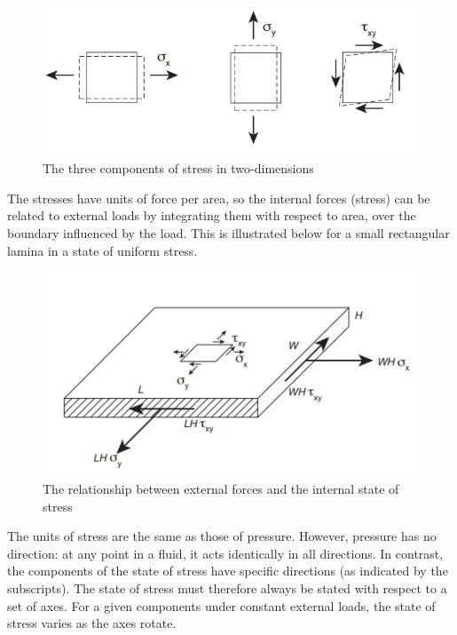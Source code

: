 \documentclass{article}
\begin{document}
\begin{figure}[h]
    \centering
    \includegraphics{images/stress1.png}
    \caption{The three components of stress in two-dimensions}
    \label{fig:enter-label}
\end{figure}

The stresses have units of force per area, so the internal forces (stress) can be related to external loads by integrating them with respect to area, over the boundary influenced by the load. This is illustrated below for a small rectangular lamina in a state of uniform stress.

\begin{figure}[h]
    \centering
    \includegraphics{images/stress2.png}
    \caption{The relationship between external forces and the internal state of stress}
    \label{fig:enter-label}
\end{figure}

The units of stress are the same as those of pressure. However, pressure has no direction: at any point in a fluid, it acts identically in all directions. In contrast, the components of the state of stress have specific directions (as indicated by the subscripts). The state of stress must therefore always be stated with respect to a set of axes. For a given components under constant external loads, the state of stress varies as the axes rotate. 
\end{document}
